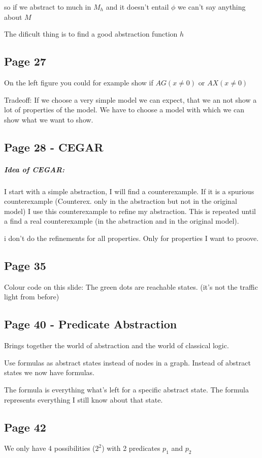 \documentclass[a4paper]{article}
\begin{document}
so if we abstract to much in $M_h$ and it doesn't entail $\phi$ we can't say
anything about $M$

The dificult thing is to find a good abstraction function $h$

\subsection{Page 27}
On the left figure you could for example show if $AG(x \neq 0)$ or $AX(x \neq
0)$

Tradeoff: If we choose a very simple model we can expect, that we an not show a
lot of properties of the model. We have to choose a model with which we can show
what we want to show.


\subsection{Page 28 - CEGAR}
\subparagraph{Idea of CEGAR:} I start with a simple abstraction, I will find a
counterexample. If it is a spurious counterexample (Counterex. only in the
abstraction but not in the original model) I use this counterexample to
refine my abstraction. This is repeated until a find a real counterexample (in
the abstraction and in the original model).

i don't do the refinements for all properties. Only for properties I want to
proove.

\subsection{Page 35}
Colour code on this slide: The green dots are reachable states. (it's not the
traffic light from before)

\subsection{Page 40 - Predicate Abstraction}
Brings together the world of abstraction and the world of classical logic.

Use formulas as abstract states instead of nodes in a graph. Instead of abstract
states we now have formulas.

The formula is everything what's left for a specific abstract state. The formula
represents everything I still know about that state.

\subsection{Page 42}
We only have 4 possibilities ($2^2$) with 2 predicates $p_1$ and $p_2$
\end{document}
